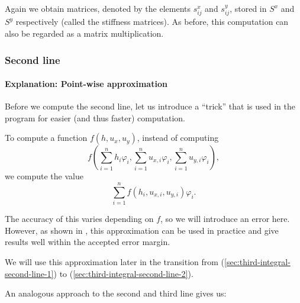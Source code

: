 \documentclass{article}
\renewcommand{\phi}{\varphi}
\begin{document}
Again we obtain matrices, denoted by the elements $s_{ij}^x$ and $s_{ij}^y$, stored in $S^x$ and $S^y$ respectively (called the stiffness matrices). As before, this computation can also be regarded as a matrix multiplication.

\subsubsection{Second line}
\label{sec:stiffness-second-line}

\paragraph{Explanation: Point-wise approximation}

Before we compute the second line, let us introduce a ``trick'' that is used in the program for easier (and thus faster) computation.

To compute a function $f(h, u_x, u_y)$, instead of computing
\begin{equation*}
  f\left(\sum_{i=1}^n h_i \phi_i,
    \sum_{i=1}^n u_{x,i} \phi_i,
    \sum_{i=1}^n u_{y,i} \phi_i\right),
\end{equation*}
we compute the value
\begin{equation*}
  \sum_{i=1}^n f(h_i,u_{x,i},u_{y,i}) \phi_i.
\end{equation*}

The accuracy of this varies depending on $f$, so we will introduce an error here. However, as shown in \cite{cockburn1999discontinuous}, this approximation can be used in practice and give results well within the accepted error margin.

We will use this approximation later in the transition from (\ref{sec:third-integral-second-line-1}) to (\ref{sec:third-integral-second-line-2}).

An analogous approach to the second and third line gives us:
\end{document}

